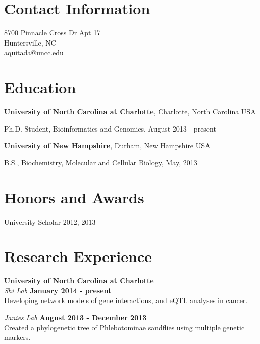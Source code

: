 \documentclass[margin,line]{res}
\newenvironment{list1}{
  \begin{list}{\ding{113}}{%
      \setlength{\itemsep}{0in}
      \setlength{\parsep}{0in} \setlength{\parskip}{0in}
      \setlength{\topsep}{0in} \setlength{\partopsep}{0in} 
      \setlength{\leftmargin}{0.17in}}}{\end{list}}
\begin{document}

\begin{resume}
\section{\sc Contact Information}
\vspace{.05in}
8700 Pinnacle Cross Dr Apt 17  \\                    
Huntersville, NC \\
aquitada@uncc.edu\\       


\section{\sc Education}
{\bf University of North Carolina at Charlotte}, Charlotte, North Carolina USA\\

\vspace*{-.1in}
\begin{list1}
\item[] Ph.D. Student, Bioinformatics and Genomics, August 2013 - present
\end{list1}


{\bf University of New Hampshire}, Durham, New Hampshire USA\\ 
\vspace*{-.1in}
\begin{list1}
\item[] B.S., Biochemistry, Molecular and Cellular Biology,  May, 2013
\end{list1}


\section{\sc Honors and Awards} 
University Scholar 2012, 2013


\section{\sc Research Experience}
{\bf University of North Carolina at Charlotte}\\
{\em Shi Lab} \hfill {\bf January 2014 - present}\\
Developing network models of gene interactions, and eQTL analyses in cancer.

{\em Janies Lab} \hfill {\bf August 2013 - December 2013}\\
Created a phylogenetic tree of Phlebotominae sandflies using multiple genetic markers.    
\hspace*{.05in} 


\end{resume}
\end{document}

